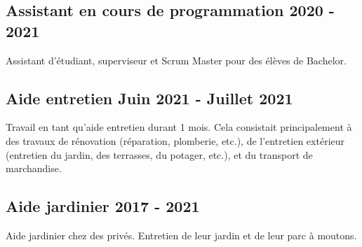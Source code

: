 

\subsection{Assistant en cours de programmation \hfill 2020 - 2021}
\vspace{0.7\baselineskip}

Assistant d'étudiant, superviseur et Scrum Master pour des élèves de Bachelor.

\vspace{0.35\baselineskip}

\subsection{Aide entretien \hfill Juin 2021 - Juillet 2021}
\vspace{0.7\baselineskip}

Travail en tant qu'aide entretien durant 1 mois. Cela consistait principalement à des travaux de rénovation (réparation, plomberie,
etc.), de l'entretien extérieur (entretien du jardin, des terrasses, du potager, etc.), et du transport de
marchandise.


\vspace{0.35\baselineskip}

\subsection{Aide jardinier \hfill 2017 - 2021}
\vspace{0.7\baselineskip}

Aide jardinier chez des privés. Entretien de leur jardin et de leur parc à moutons.

\vspace{0.35\baselineskip}


